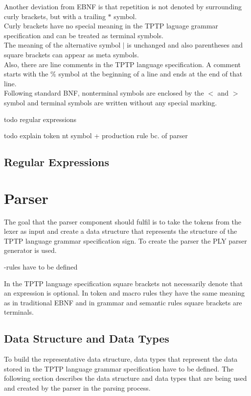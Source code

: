 Another deviation from \ac{EBNF} is that repetition is not denoted by surrounding curly brackets, but with a trailing $*$ symbol.\\
Curly brackets have no special meaning in the \ac{TPTP} laguage grammar specification and can be treated as terminal symbols.\\
The meaning of the alternative symbol $|$ is unchanged and also parentheses and square brackets can appear as meta symbols.\\
Also, there are line comments in the \ac{TPTP} language specification.
A comment starts with the $\%$ symbol at the beginning of a line and ends at the end of that line.\\
Following standard \ac {BNF}, nonterminal symbols are enclosed by the $<$ and $>$ symbol and terminal symbols are written without any special marking.

todo regular expressions
 
todo explain token nt symbol + production rule bc. of parser
\subsection{Regular Expressions}\label{sec:ConceptRegularExpressions}

\section{Parser}\label{ConceptParser}
The goal that the parser component should fulfil is to take the tokens from the lexer as input and create a data structure that represents the structure of the \ac{TPTP} language grammar specification sign.
To create the parser the \ac{PLY} parser generator is used.

-rules have to be defined

In the \ac{TPTP} language specification square brackets not necessarily denote that an expression is optional.
In token and macro rules they have the same meaning as in traditional \ac{EBNF} and in grammar and semantic rules square brackets are terminals.

\subsection{Data Structure and Data Types}\label{sec:ConceptParserDataStructure}
To build the representative data structure, data types that represent the data stored in the \ac{TPTP} language grammar specification have to be defined.
The following section describes the data structure and data types that are being used and created by the parser in the parsing process.

